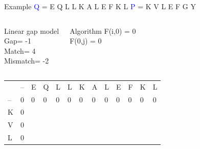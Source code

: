 \documentclass{bredelebeamer}
\begin{document}
 \begin{frame}{Example}
   \centering
 \textcolor{blue}{Q} = E Q L L K A L E F K L \quad \textcolor{blue}{P} = K V L E F G Y
\begin{columns}
\begin{block}{Linear gap model} \\
Gap= -1 \\
Match= 4 \\
Mismatch= -2
\end{block}
\begin{block}{Algorithm}
F(i,0) = 0\\
F(0,j) = 0
\end{block}
\end{columns}
     
     \begin{table}[]
\centering
\begin{tabular}{*{13}{p{0.4cm}}}
                        & --                     & E                      & Q                      & L                      & L                      & K                      & A                      & L                      & E                      & F                      & K                      & L                      \\ \cline{2-13} 
\multicolumn{1}{l|}{--} & \multicolumn{1}{l|}{0} & \multicolumn{1}{l|}{0} & \multicolumn{1}{l|}{0} & \multicolumn{1}{l|}{0} & \multicolumn{1}{l|}{0} & \multicolumn{1}{l|}{0} & \multicolumn{1}{l|}{0} & \multicolumn{1}{l|}{0} & \multicolumn{1}{l|}{0} & \multicolumn{1}{l|}{0} & \multicolumn{1}{l|}{0} & \multicolumn{1}{l|}{0} \\ \cline{2-13} 
\multicolumn{1}{l|}{K}  & \multicolumn{1}{l|}{0} & \multicolumn{1}{l|}{}  & \multicolumn{1}{l|}{}  & \multicolumn{1}{l|}{}  & \multicolumn{1}{l|}{}  & \multicolumn{1}{l|}{}  & \multicolumn{1}{l|}{}  & \multicolumn{1}{l|}{}  & \multicolumn{1}{l|}{}  & \multicolumn{1}{l|}{}  & \multicolumn{1}{l|}{}  & \multicolumn{1}{l|}{}  \\ \cline{2-13} 
\multicolumn{1}{l|}{V}  & \multicolumn{1}{l|}{0} & \multicolumn{1}{l|}{}  & \multicolumn{1}{l|}{}  & \multicolumn{1}{l|}{}  & \multicolumn{1}{l|}{}  & \multicolumn{1}{l|}{}  & \multicolumn{1}{l|}{}  & \multicolumn{1}{l|}{}  & \multicolumn{1}{l|}{}  & \multicolumn{1}{l|}{}  & \multicolumn{1}{l|}{}  &       \multicolumn{1}{l|}{}  \\ \cline{2-13} %
\multicolumn{1}{l|}{L}  & \multicolumn{1}{l|}{0} & \multicolumn{1}{l|}{}  & \multicolumn{1}{l|}{}  & \multicolumn{1}{l|}{}  & \multicolumn{1}{l|}{}  & \multicolumn{1}{l|}{}  & \multicolumn{1}{l|}{}  & \multicolumn{1}{l|}{}  & \multicolumn{1}{l|}{}  & \multicolumn{1}{l|}{}  & \multicolumn{1}{l|}{}  & \multicolumn{1}{l|}{}  \\ \cline{2-13} 

\end{tabular}
\end{table}
\end{frame}
\end{document}

